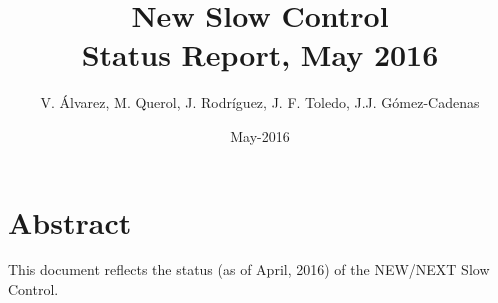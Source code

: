 \documentclass[11pt]{article}
\begin{document}

\title{New Slow Control \\Status Report, May 2016}

\author{V. \'Alvarez, M. Querol, J. Rodr\'iguez, J. F. Toledo, J.J. G\'omez-Cadenas}
\date{May-2016}

\maketitle

\section*{Abstract}

This document reflects the status (as of April, 2016) of the NEW/NEXT Slow Control.

\clearpage

\tableofcontents

\clearpage


\end{document}
